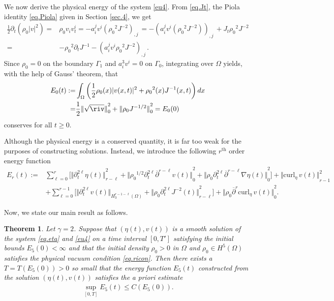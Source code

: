 \documentclass[12pt,twoside,reqno]{amsart}
\numberwithin{equation}{section}
\newtheorem{theorem}{Theorem}[section]
\theoremstyle{definition}
\theoremstyle{remark}
\begin{document}
We now derive the physical energy of the system \eqref{eu4}. From \eqref{eq.Jt}, the Piola identity \eqref{eq.Piola} given in Section \ref{sec.4}, we get
  \begin{align*}
\frac{1}{2}{\partial}_t({\rho_0} |v|^2)=&{\rho_0} v_i v_t^i
    =-a^j_iv^i{{{\left({\rho_0}^2 J^{-2}\right)}}_{,{j}}\,}
    =-{{{\left(a^j_iv^i\left({\rho_0}^2 J^{-2}\right)\right)}}_{,{j}}\,}+J_t{\rho_0}^2 J^{-2}\\
    =&-  {\rho_0}^2 {\partial}_t J^{-1}-{{{(a^j_iv^i{\rho_0}^2 J^{-2})}}_{,{j}}\,}.
  \end{align*}
  Since ${\rho_0}=0$ on the boundary ${\Gamma_1}$ and $a^3_iv^i=0$ on $\Gamma_0$, integrating over $\Omega$ yields,  with the help of Gauss' theorem, that
\begin{align*}
    E_0(t):=&\int_\Omega \left(\frac{1}{2}{\rho_0}(x) |v(x,t)|^2+ {\rho_0}^2(x) J^{-1}(x,t)\right) dx\\
    =&\frac{1}{2}{\Vert{\sqrt\riv}\Vert}_0^2 + {\Vert{{\rho_0} J^{-1/2}}\Vert}_0^2=E_0(0)
\end{align*}
conserves for all $t{\geqslant} 0$.

Although the physical energy is a conserved quantity, it is far too weak for the purposes of constructing solutions. Instead, we introduce the following $r^{\text{th}}$ order energy function
\begin{align*}
  E_r(t):=&\sum_{\ell=0}^r\Big[{\Vert{{\partial}_t^{2\ell}\eta(t)}\Vert}_{r-\ell}^2+ {\Vert{{\rho_0}^{1/2}{\partial}_t^{2\ell}{\overline{\partial}}^{r-\ell}v(t)}\Vert}_0^2
  +{\Vert{{\rho_0} {\partial}_t^{2\ell}{\overline{\partial}}^{r-\ell}{\nabla} \eta(t)}\Vert}_0^2\Big]+{\Vert{{\mathrm{curl}_\eta\,} v(t)}\Vert}_{r-1}^2\\ &+\sum_{\ell=0}^{r-1}\Big[{\Vert{{\partial}_t^{2\ell} v(t)}\Vert}_{H_3^{r-1-\ell}(\Omega)}+{\Vert{{\rho_0} {\partial}_t^{2\ell} J^{-2}(t)}\Vert}_{r-\ell}^2\Big]+{\Vert{{\rho_0}{\overline{\partial}}^r{\mathrm{curl}_\eta\,} v(t)}\Vert}_0^2.
\end{align*}

Now, we state our main result as follows.
\begin{theorem}
  Let $\gamma=2$. Suppose that $(\eta(t),v(t))$ is a smooth solution of the system \eqref{eq.eta} and \eqref{eu4} on a time interval $[0,T']$ satisfying the initial bounds $E_5(0)<\infty$ and that the initial density ${\rho_0}>0$ in $\Omega$ and ${\rho_0}  \in H^5(\Omega)$ satisfies the physical vacuum condition \eqref{eq.ricon}. Then there exists a $T=T(E_5(0))>0$ so small  that the energy function $E_5(t)$ constructed from the solution $(\eta(t),v(t))$ satisfies the a priori estimate
  \begin{align*}
    \sup_{[0,T]}E_5(t){\leqslant} C(E_5(0)).
  \end{align*}
\end{theorem}
\end{document}

